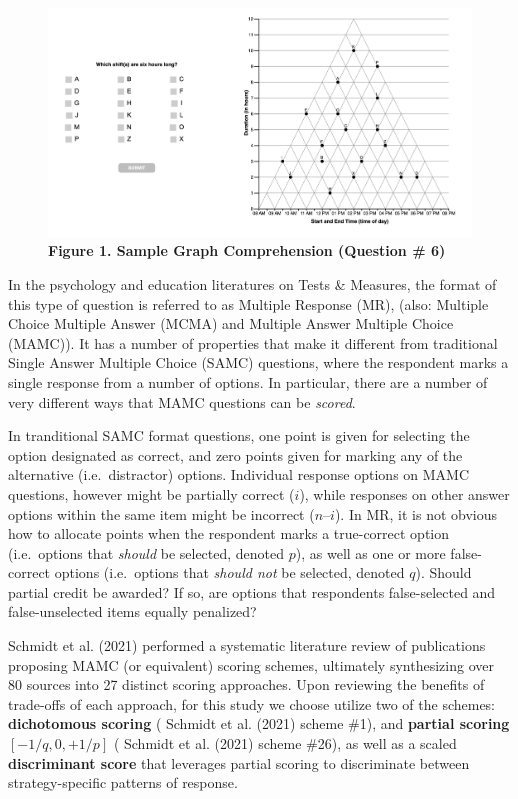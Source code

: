 \documentclass[
  letterpaper,
  DIV=11,
  numbers=noendperiod]{scrreprt}
\begin{document}
\begin{figure}

{\centering \includegraphics{analysis/SGC3A/static/img/sample_graphComprehensionTask.png}

}

\caption{\textbf{Figure 1. Sample Graph Comprehension (Question \# 6)}}

\end{figure}

In the psychology and education literatures on Tests \& Measures, the
format of this type of question is referred to as Multiple Response
(MR), (also: Multiple Choice Multiple Answer (MCMA) and Multiple Answer
Multiple Choice (MAMC)). It has a number of properties that make it
different from traditional Single Answer Multiple Choice (SAMC)
questions, where the respondent marks a single response from a number of
options. In particular, there are a number of very different ways that
MAMC questions can be \emph{scored}.

In tranditional SAMC format questions, one point is given for selecting
the option designated as correct, and zero points given for marking any
of the alternative (i.e.~distractor) options. Individual response
options on MAMC questions, however might be partially correct (\(i\)),
while responses on other answer options within the same item might be
incorrect (\(n – i\)). In MR, it is not obvious how to allocate points
when the respondent marks a true-correct option (i.e.~options that
\emph{should} be selected, denoted \(p\)), as well as one or more
false-correct options (i.e.~options that \emph{should not} be selected,
denoted \(q\)). Should partial credit be awarded? If so, are options
that respondents false-selected and false-unselected items equally
penalized?

Schmidt et al. (2021) performed a systematic literature review of
publications proposing MAMC (or equivalent) scoring schemes, ultimately
synthesizing over 80 sources into 27 distinct scoring approaches. Upon
reviewing the benefits of trade-offs of each approach, for this study we
choose utilize two of the schemes: \textbf{dichotomous scoring} (
Schmidt et al. (2021) scheme \#1), and \textbf{partial scoring}
\([-1/q,0, +1/p]\) ( Schmidt et al. (2021) scheme \#26), as well as a
scaled \textbf{discriminant score} that leverages partial scoring to
discriminate between strategy-specific patterns of response.
\end{document}
